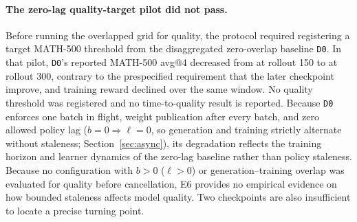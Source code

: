 \documentclass[10pt]{article}
\begin{document}
\begin{table}[H]
\caption{Asynchronous cross-slab rollout--train overlap across 32-GPU AR (Qwen3-4B-Base GRPO, 16 train $+$ 16 rollout GPUs) and eight-GPU diffusion (SD3.5-Medium Flow-GRPO, 4 train $+$ 4 rollout GPUs) over 12 steady-state steps per arm (steps 4--15). ``Gen/Wait'' reports exposed rollout collection wait for AR and generation time for diffusion.}
\label{tab:async-overlap}
\centering
\scriptsize
{}
\end{table}

\paragraph{The zero-lag quality-target pilot did not pass.}
Before running the overlapped grid for quality, the protocol required registering a target MATH-500 threshold from the disaggregated zero-overlap baseline \texttt{D0}.
In that pilot, \texttt{D0}'s reported MATH-500 avg@4 decreased from \ESixQualityEarly{} at rollout 150 to \ESixQualityLate{} at rollout 300, contrary to the prespecified requirement that the later checkpoint improve, and training reward declined over the same window.
No quality threshold was registered and no time-to-quality result is reported.
Because \texttt{D0} enforces one batch in flight, weight publication after every batch, and zero allowed policy lag ($b = 0 \Rightarrow \ell = 0$, so generation and training strictly alternate without staleness; Section~\ref{sec:async}), its degradation reflects the training horizon and learner dynamics of the zero-lag baseline rather than policy staleness.
Because no configuration with $b > 0$ ($\ell > 0$) or generation--training overlap was evaluated for quality before cancellation, E6 provides no empirical evidence on how bounded staleness affects model quality.
Two checkpoints are also insufficient to locate a precise turning point.
\end{document}
